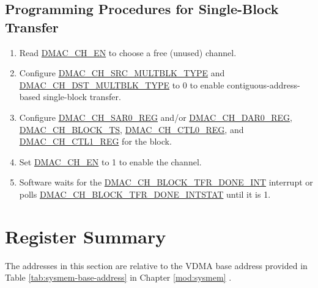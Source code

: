 \documentclass[main\_\_EN.tex]{subfiles}
\begin{document}
\subsection{Programming Procedures for Single-Block Transfer}

\begin{enumerate}
    \item Read \hyperref[fielddesc:DMACCH1EN]{DMAC\_CH\_EN} to choose a free (unused) channel.
    \item Configure \hyperref[fielddesc:DMACCHNSRCMULTBLKTYPE]{DMAC\_CH\_SRC\_MULTBLK\_TYPE} and \hyperref[fielddesc:DMACCHNDSTMULTBLKTYPE]{DMAC\_CH\_DST\_MULTBLK\_TYPE} to 0 to enable contiguous-address-based single-block transfer.
    \item Configure \hyperref[regdesc:DMACCHNSAR0REG]{DMAC\_CH\_SAR0\_REG} and/or \hyperref[regdesc:DMACCHNDAR0REG]{DMAC\_CH\_DAR0\_REG}, \hyperref[fielddesc:DMACCHNBLOCKTS]{DMAC\_CH\_BLOCK\_TS}, \hyperref[regdesc:DMACCHNCTL0REG]{DMAC\_CH\_CTL0\_REG}, and \hyperref[regdesc:DMACCHNCTL1REG]{DMAC\_CH\_CTL1\_REG} for the block.
    \item Set \hyperref[fielddesc:DMACCH1EN]{DMAC\_CH\_EN} to 1 to enable the channel.

    \item Software waits for the \hyperref[int:DMACCHNBLOCKTFRDONEINT]{DMAC\_CH\_BLOCK\_TFR\_DONE\_INT} interrupt or polls \hyperref[fielddesc:DMACCHNBLOCKTFRDONEINTSTAT]{DMAC\_CH\_BLOCK\_TFR\_DONE\_INTSTAT} until it is 1.
\end{enumerate}




\newpage
\hypertarget{VDMA-reg-summ}{}
\section{Register Summary}
\label{sec:VDMA-reg-summ}

The addresses in this section are relative to the VDMA base address provided in Table \ref{tab:sysmem-base-address} in Chapter \ref{mod:sysmem} \textit{}.
\end{document}

